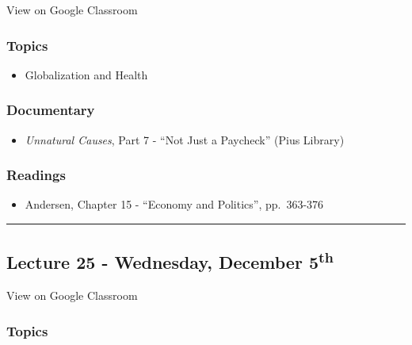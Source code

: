 \documentclass[]{book}
\providecommand{\tightlist}{%
  \setlength{\itemsep}{0pt}\setlength{\parskip}{0pt}}
\theoremstyle{definition}
\theoremstyle{definition}
\theoremstyle{definition}
\theoremstyle{remark}
\begin{document}
View on Google Classroom

\hypertarget{topics-28}{%
\subsubsection*{Topics}\label{topics-28}}

\begin{itemize}
\tightlist
\item
  Globalization and Health
\end{itemize}

\hypertarget{documentary-5}{%
\subsubsection*{Documentary}\label{documentary-5}}

\begin{itemize}
\tightlist
\item
  \emph{Unnatural Causes}, Part 7 - ``Not Just a Paycheck'' (Pius
  Library)
\end{itemize}

\hypertarget{readings-26}{%
\subsubsection*{Readings}\label{readings-26}}

\begin{itemize}
\tightlist
\item
  Andersen, Chapter 15 - ``Economy and Politics'', pp.~363-376
\end{itemize}

\begin{center}\rule{0.5\linewidth}{\linethickness}\end{center}

\hypertarget{lecture-25---wednesday-december-5th}{%
\subsection*{\texorpdfstring{Lecture 25 - Wednesday, December
5\textsuperscript{th}}{Lecture 25 - Wednesday, December 5th}}\label{lecture-25---wednesday-december-5th}}

View on Google Classroom

\hypertarget{topics-29}{%
\subsubsection*{Topics}\label{topics-29}}
\end{document}

